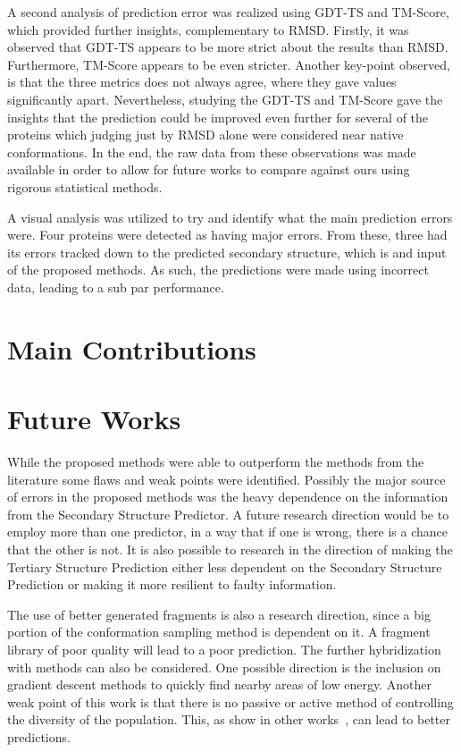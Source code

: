 A second analysis of prediction error was realized using GDT-TS and TM-Score,
which provided further insights, complementary to RMSD. Firstly, it was observed
that GDT-TS appears to be more strict about the results than RMSD. Furthermore,
TM-Score appears to be even stricter. Another key-point observed, is that the
three metrics does not always agree, where they gave values significantly
apart. Nevertheless, studying the GDT-TS and TM-Score gave the insights that
the prediction could be improved even further for several of the proteins which
judging just by RMSD alone were considered near native conformations. In the end,
the raw data from these observations was made available in order to allow for
future works to compare against ours using rigorous statistical methods.

A visual analysis was utilized to try and identify what the main prediction
errors were. Four proteins were detected as having major errors. From these,
three had its errors tracked down to the predicted secondary structure, which is
and input of the proposed methods. As such, the predictions were made using
incorrect data, leading to a sub par performance.

\section{Main Contributions} \label{sec:main-contributions}

\section{Future Works}\label{sec:future_works}

While the proposed methods were able to outperform the methods from the
literature some flaws and weak points were identified. Possibly the major
source of errors in the proposed methods was the heavy dependence on the
information from the Secondary Structure Predictor. A future research direction
would be to employ more than one predictor, in a way that if one is wrong,
there is a chance that the other is not. It is also possible to research in the
direction of making the Tertiary Structure Prediction either less dependent on
the Secondary Structure Prediction or making it more resilient to faulty
information.

The use of better generated fragments is also a research direction, since a big
portion of the conformation sampling method is dependent on it. A fragment
library of poor quality will lead to a poor prediction.
The further hybridization with methods can also be considered.  One possible
direction is the inclusion on gradient descent methods to quickly find nearby
areas of low energy.
Another weak point of this work is that there is no passive or active method of
controlling the diversity of the population. This, as show in other
works~\cite{narloch2016diversification,simoncini2017balancing}, can lead to
better predictions.


